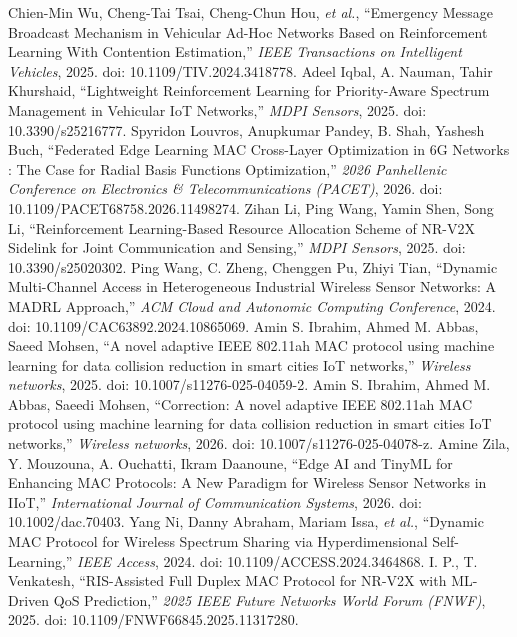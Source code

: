 

 Chien-Min Wu, Cheng-Tai Tsai, Cheng-Chun Hou, \emph{et al.}, ``Emergency Message Broadcast Mechanism in Vehicular Ad-Hoc Networks Based on Reinforcement Learning With Contention Estimation,'' \emph{IEEE Transactions on Intelligent Vehicles}, 2025. doi: 10.1109/TIV.2024.3418778.
 Adeel Iqbal, A. Nauman, Tahir Khurshaid, ``Lightweight Reinforcement Learning for Priority-Aware Spectrum Management in Vehicular IoT Networks,'' \emph{MDPI Sensors}, 2025. doi: 10.3390/s25216777.
 Spyridon Louvros, Anupkumar Pandey, B. Shah, Yashesh Buch, ``Federated Edge Learning MAC Cross-Layer Optimization in 6G Networks : The Case for Radial Basis Functions Optimization,'' \emph{2026 Panhellenic Conference on Electronics & Telecommunications (PACET)}, 2026. doi: 10.1109/PACET68758.2026.11498274.
 Zihan Li, Ping Wang, Yamin Shen, Song Li, ``Reinforcement Learning-Based Resource Allocation Scheme of NR-V2X Sidelink for Joint Communication and Sensing,'' \emph{MDPI Sensors}, 2025. doi: 10.3390/s25020302.
 Ping Wang, C. Zheng, Chenggen Pu, Zhiyi Tian, ``Dynamic Multi-Channel Access in Heterogeneous Industrial Wireless Sensor Networks: A MADRL Approach,'' \emph{ACM Cloud and Autonomic Computing Conference}, 2024. doi: 10.1109/CAC63892.2024.10865069.
 Amin S. Ibrahim, Ahmed M. Abbas, Saeed Mohsen, ``A novel adaptive IEEE 802.11ah MAC protocol using machine learning for data collision reduction in smart cities IoT networks,'' \emph{Wireless networks}, 2025. doi: 10.1007/s11276-025-04059-2.
 Amin S. Ibrahim, Ahmed M. Abbas, Saeedi Mohsen, ``Correction: A novel adaptive IEEE 802.11ah MAC protocol using machine learning for data collision reduction in smart cities IoT networks,'' \emph{Wireless networks}, 2026. doi: 10.1007/s11276-025-04078-z.
 Amine Zila, Y. Mouzouna, A. Ouchatti, Ikram Daanoune, ``Edge AI and TinyML for Enhancing MAC Protocols: A New Paradigm for Wireless Sensor Networks in IIoT,'' \emph{International Journal of Communication Systems}, 2026. doi: 10.1002/dac.70403.
 Yang Ni, Danny Abraham, Mariam Issa, \emph{et al.}, ``Dynamic MAC Protocol for Wireless Spectrum Sharing via Hyperdimensional Self-Learning,'' \emph{IEEE Access}, 2024. doi: 10.1109/ACCESS.2024.3464868.
 I. P., T. Venkatesh, ``RIS-Assisted Full Duplex MAC Protocol for NR-V2X with ML-Driven QoS Prediction,'' \emph{2025 IEEE Future Networks World Forum (FNWF)}, 2025. doi: 10.1109/FNWF66845.2025.11317280.


